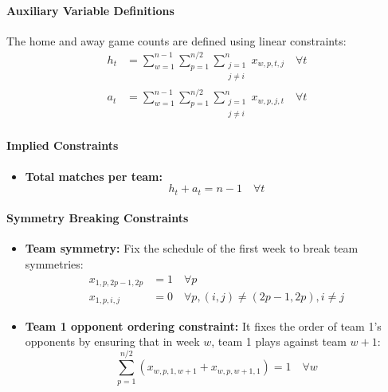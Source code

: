 \documentclass[11pt]{article}
\begin{document}
\paragraph{Auxiliary Variable Definitions}

The home and away game counts are defined using linear constraints:
\begin{align}
h_t &= \sum_{w=1}^{n-1} \sum_{p=1}^{n/2} \sum_{\substack{j=1 \\ j \neq i}}^{n} x_{w,p,t,j} \quad \forall t \\
a_t &= \sum_{w=1}^{n-1} \sum_{p=1}^{n/2} \sum_{\substack{j=1 \\ j \neq i}}^{n} x_{w,p,j,t} \quad \forall t
\end{align}

\paragraph{Implied Constraints}
\begin{itemize}
    \item \textbf{Total matches per team:}
    \begin{equation}
        h_t + a_t = n - 1 \quad \forall t
    \end{equation}
\end{itemize}

\paragraph{Symmetry Breaking Constraints}

\begin{itemize}
    \item \textbf{Team symmetry:} Fix the schedule of the first week to break team symmetries:
    \begin{align}
        x_{1,p,2p-1,2p} &= 1 \quad \forall p \\
        x_{1,p,i,j} &= 0 \quad \forall p, (i,j) \neq (2p-1, 2p), i \neq j
    \end{align}

    \item \textbf{Team 1 opponent ordering constraint:}
It fixes the order of team 1's opponents by ensuring that in week $w$, team 1 plays against team $w+1$:
\begin{equation}
    \sum_{p=1}^{n/2} \left( x_{w,p,1,w+1} + x_{w,p,w+1,1} \right) = 1 \quad \forall w
\end{equation}
\end{itemize}
\end{document}
